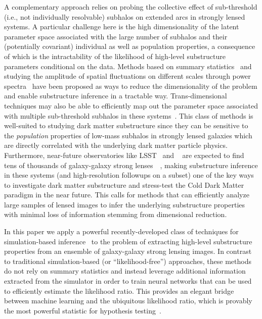 \documentclass[twocolumn]{aastex62}
\begin{document}
A complementary approach relies on probing the collective effect of sub-threshold (i.e., not individually resolvable) subhalos on extended arcs in strongly lensed systems. A particular challenge here is the high dimensionality of the latent parameter space associated with the large number of subhalos and their (potentially covariant) individual as well as population properties, a consequence of which is the intractability of the likelihood of high-level substructure parameters conditional on the data. Methods based on summary statistics~\citep{1702.00009} and studying the amplitude of spatial fluctuations on different scales through power spectra~\citep{1403.2720,1809.00004,1707.04590,1806.07897,1808.03501,1710.03075,1506.01724} have been proposed as ways to reduce the dimensionality of the problem and enable substructure inference in a tractable way. Trans-dimensional techniques may also be able to efficiently map out the parameter space associated with multiple sub-threshold subhalos in these systems~\citep{1508.00662,1706.06111}. This class of methods is well-suited to studying dark matter substructure since they can be sensitive to the \emph{population} properties of low-mass subhalos in strongly lensed galaxies which are directly correlated with the underlying dark matter particle physics. Furthermore, near-future observatories like LSST~\citep{0912.0201,2019arXiv190201055D,1902.05141} and \Euclid~\citep{1001.0061} are expected to find tens of thousands of galaxy-galaxy strong lenses~~\citep{2015ApJ...811...20C,1001.2037,1003.5567}, making substructure inference in these systems (and high-resolution followups on a subset) one of the key ways to investigate dark matter substructure and stress-test the Cold Dark Matter paradigm in the near future. This calls for methods that can efficiently analyze large samples of lensed images to infer the underlying substructure properties with minimal loss of information stemming from dimensional reduction.

In this paper we apply a powerful recently-developed class of techniques for simulation-based inference~\citep{1805.00013,1805.00020,1805.12244} to the problem of extracting high-level substructure properties from an ensemble of galaxy-galaxy strong lensing images. In contrast to traditional simulation-based (or ``likelihood-free'') approaches, these methods do not rely on summary statistics and instead leverage additional information extracted from the simulator in order to train neural networks that can be used to efficiently estimate the likelihood ratio. This provides an elegant bridge between machine learning and the ubiquitous likelihood ratio, which is provably the most powerful statistic for hypothesis testing~\citep{1933RSPTA.231..289N}.
\end{document}
